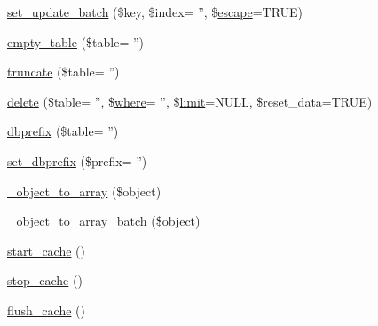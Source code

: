 \begin{DoxyCompactItemize}
\item 
\hyperlink{class_c_i___d_b__active__record_a545a5065c17fae640a0f46b99798c443}{set\-\_\-update\-\_\-batch} (\$key, \$index= '', \$\hyperlink{class_c_i___d_b__driver_ac8f37ca5703d4558c732e692194f8cd6}{escape}=T\-R\-U\-E)
\item 
\hyperlink{class_c_i___d_b__active__record_adb594700d683271e17cc5041099d8d40}{empty\-\_\-table} (\$table= '')
\item 
\hyperlink{class_c_i___d_b__active__record_a59e71805908a91d2b45089c0137b5bc7}{truncate} (\$table= '')
\item 
\hyperlink{class_c_i___d_b__active__record_a98c786dcc4964dbb2307636c523c1ebd}{delete} (\$table= '', \$\hyperlink{class_c_i___d_b__active__record_a7519d8b5035bdb081e1e7d9cc7c716fb}{where}= '', \$\hyperlink{class_c_i___d_b__active__record_a7514ed2c519255f6ad52366ff2157b4a}{limit}=N\-U\-L\-L, \$reset\-\_\-data=T\-R\-U\-E)
\item 
\hyperlink{class_c_i___d_b__active__record_a1e6bfc7a51f973e57bc948474e699e96}{dbprefix} (\$table= '')
\item 
\hyperlink{class_c_i___d_b__active__record_a18182914d989b4d6781bda1163db31d7}{set\-\_\-dbprefix} (\$prefix= '')
\item 
\hyperlink{class_c_i___d_b__active__record_a50b3069661bbf4605b6b561f38eae849}{\-\_\-object\-\_\-to\-\_\-array} (\$object)
\item 
\hyperlink{class_c_i___d_b__active__record_ab53f659c5df0b0b6d30eaab74f507dc5}{\-\_\-object\-\_\-to\-\_\-array\-\_\-batch} (\$object)
\item 
\hyperlink{class_c_i___d_b__active__record_a2d4f0c7b71f87dc7ca7f7fcfbdd12ba0}{start\-\_\-cache} ()
\item 
\hyperlink{class_c_i___d_b__active__record_a612e54a6230b7e899c4d2a42a234bd5a}{stop\-\_\-cache} ()
\item 
\hyperlink{class_c_i___d_b__active__record_aa3c94d79d552f6e10277b01c447ebbb6}{flush\-\_\-cache} ()
\end{DoxyCompactItemize}
